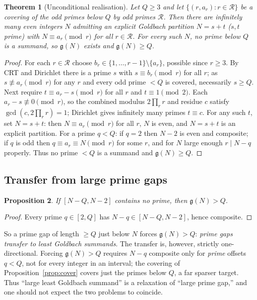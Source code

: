 \documentclass[11pt]{article}
\theoremstyle{plain}
\newtheorem{theorem}{Theorem}
\newtheorem{proposition}[theorem]{Proposition}
\theoremstyle{definition}
\theoremstyle{remark}
\newcommand{\N}{N}
\newcommand{\g}{\mathfrak{g}}
\begin{document}
\begin{theorem}[Unconditional realisation]\label{thm:coverdirichlet}
Let $Q\ge3$ and let $\{(r,a_r):r\in\mathcal R\}$ be a covering of the odd primes
below $Q$ by odd primes $\mathcal R$. Then there are infinitely many even
integers $\N$ admitting an explicit Goldbach partition $\N=s+t$ ($s,t$ prime)
with $\N\equiv a_r\pmod r$ for all $r\in\mathcal R$. For every such $\N$, no prime
below $Q$ is a summand, so $\g(\N)$ exists and $\g(\N)\ge Q$.
\end{theorem}
\begin{proof}
For each $r\in\mathcal R$ choose $b_r\in\{1,\dots,r-1\}\setminus\{a_r\}$, possible
since $r\ge3$. By CRT and Dirichlet there is a prime $s$ with $s\equiv b_r\pmod r$
for all $r$; as $s\not\equiv a_r\pmod r$ for any $r$ and every odd prime $<Q$ is
covered, necessarily $s\ge Q$. Next require $t\equiv a_r-s\pmod r$ for all $r$ and
$t\equiv1\pmod2$. Each $a_r-s\not\equiv0\pmod r$, so the combined modulus
$2\prod_r r$ and residue $c$ satisfy $\gcd(c,2\prod_r r)=1$; Dirichlet gives
infinitely many primes $t\equiv c$. For any such $t$, set $\N=s+t$: then
$\N\equiv a_r\pmod r$ for all $r$, $\N$ is even, and $\N=s+t$ is an explicit
partition. For a prime $q<Q$: if $q=2$ then $\N-2$ is even and composite; if $q$
is odd then $q\equiv a_r\equiv\N\pmod r$ for some $r$, and for $\N$ large enough
$r\mid\N-q$ properly. Thus no prime $<Q$ is a summand and $\g(\N)\ge Q$.
\end{proof}

\subsection{Transfer from large prime gaps}\label{sec:gaps}

\begin{proposition}\label{prop:transfer}
If $[\N-Q,\N-2]$ contains no prime, then $\g(\N)>Q$.
\end{proposition}
\begin{proof}
Every prime $q\in[2,Q]$ has $\N-q\in[\N-Q,\N-2]$, hence composite.
\end{proof}

So a prime gap of length $\ge Q$ just below $\N$ forces $\g(\N)>Q$: \emph{prime
gaps transfer to least Goldbach summands}. The transfer is, however, strictly
one-directional. Forcing $\g(\N)>Q$ requires $\N-q$ composite only for
\emph{prime} offsets $q<Q$, not for every integer in an interval; the covering of
Proposition~\ref{prop:cover} covers just the primes below $Q$, a far sparser
target. Thus ``large least Goldbach summand'' is a relaxation of ``large prime
gap,'' and one should not expect the two problems to coincide.
\end{document}
